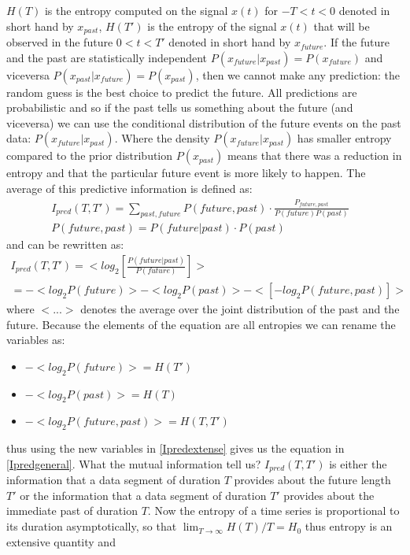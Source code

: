 $H(T)$ is the entropy computed on the signal $x(t)$ for $-T<t<0$ denoted in short
 hand by $x_{past}$, $H(T')$ is the entropy of the signal $x(t)$ that will be observed
 in the future $0<t<T'$ denoted in short hand by $x_{future}$. If the future and the
 past are statistically independent $P(x_{future}|x_{past})=P(x_{future})$
and viceversa $P(x_{past}|x_{future})=P(x_{past})$, then we cannot make any prediction:
the random guess is the best choice to predict the future. All predictions are
 probabilistic and so if the past tells us something about the future (and viceversa)
 we can use the conditional distribution of the future events on the past data:
$P(x_{future}|x_{past})$. Where the density $P(x_{future}|x_{past})$ has smaller
entropy compared to the prior distribution $P(x_{past})$ means that there was
 a reduction in entropy and that the particular future event is more likely to happen.
The average of this predictive information is defined as:
\begin{eqnarray}
I_{pred}(T,T')=\sum_{past,future} P(future,past)\cdot \frac{P_{future,past}}{P(future) P(past)}&\\
P(future,past)=P(future|past)\cdot P(past)&
\end{eqnarray}
and can be rewritten as:
\begin{eqnarray}
 I_{pred}(T,T')=<log_2 [\frac{P(future|past)}{P(future)}]>& \\
=-<log_2 P(future)> -<log_2 P(past)> -<[-log_2 P(future,past)]>& \label{Ipredextense}
\end{eqnarray}
where $<...>$ denotes the average over the joint distribution of the past and the future.
Because the elements of the equation are all entropies we can rename the variables as:
\begin{itemize}
\item $-<log_2 P(future)>=H(T')$
\item $-<log_2 P(past)>=H(T)$
\item $-<log_2 P(future,past)>=H(T,T')$
\end{itemize}
thus using the new variables in \ref{Ipredextense} gives us the equation in \ref{Ipredgeneral}.
What the mutual information tell us?
$I_{pred}(T,T')$ is either the information that a data segment of duration $T$
provides about the future length $T'$ or the information that a data segment of
duration $T'$ provides about the immediate past of duration $T$.
Now the entropy of a time series is proportional to its duration asymptotically,
so that $\lim_{T\to\infty} H(T)/T=H_0$ thus entropy is an extensive quantity and
